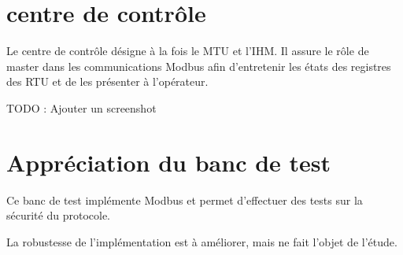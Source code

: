 \documentclass[10pt,a4paper]{article}
\begin{document}
\section{centre de contrôle}
Le centre de contrôle désigne à la fois le MTU et l'IHM. Il assure le rôle de master dans les communications Modbus afin d'entretenir les états des registres des RTU et de les présenter à l'opérateur.

TODO : Ajouter un screenshot


\section{Appréciation du banc de test}

Ce banc de test implémente Modbus et permet d'effectuer des tests sur la sécurité du protocole.

La robustesse de l'implémentation est à améliorer, mais ne fait l'objet de l'étude.
\end{document}
